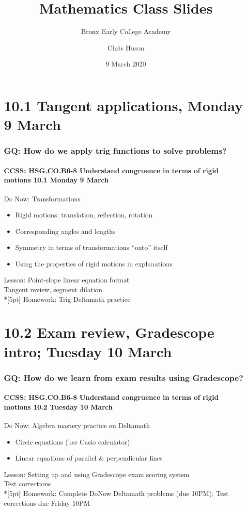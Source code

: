 \documentclass{beamer}
\title{Mathematics Class Slides}
\subtitle{Bronx Early College Academy}
\author{Chris Huson}
\date{9 March 2020}
\begin{document}
\frame{\titlepage}
\section[Outline]{}
\frame{\tableofcontents}

\section{10.1 Tangent applications, Monday 9 March} 
\frame
{
  \frametitle{GQ: How do we apply trig functions to solve problems?}
  \framesubtitle{CCSS: HSG.CO.B6-8 Understand congruence in terms of rigid motions \hfill \alert{10.1 Monday  9 March}}

  \begin{block}{Do Now: Transformations}
  \begin{itemize}
    \item Rigid motions: translation, reflection, rotation
    \item Corresponding angles and lengths
    \item Symmetry in terms of transformations ``onto'' itself
    \item Using the properties of rigid motions in explanations
  \end{itemize}
  \end{block}
  Lesson: Point-slope linear equation format \\
  Tangent review, segment dilation\\*[5pt]
  Homework: Trig Deltamath practice
}

\section{10.2 Exam review, Gradescope intro; Tuesday 10 March} 
\frame
{
  \frametitle{GQ: How do we learn from exam results using Gradescope?}
  \framesubtitle{CCSS: HSG.CO.B6-8 Understand congruence in terms of rigid motions \hfill \alert{10.2 Tuesday 10 March}}

  \begin{block}{Do Now: Algebra mastery practice on Deltamath}
    \begin{itemize}
      \item Circle equations (use Casio calculator)
      \item Linear equations of parallel \& perpendicular lines
    \end{itemize}
    \end{block}
    Lesson: Setting up and using Gradescope exam scoring system \\
    Test corrections\\*[5pt]
    Homework: Complete DoNow Deltamath problems (due 10PM); Test corrections due Friday 10PM
}
\end{document}
